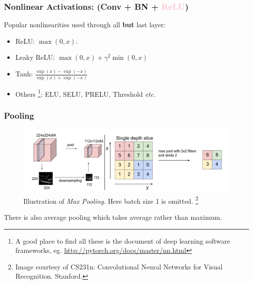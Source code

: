 \documentclass[10pt]{beamer}
\newcommand{\etc}{{\it etc.}}
\begin{document}
\begin{frame}
\frametitle{Nonlinear Activations: (Conv + BN + \textcolor{pink}{\textbf{ReLU}})}
Popular nonlinearities used through all \textbf{but} last layer:
\begin{itemize}
	\item ReLU: $\max (0, x)$.
	\item Leaky ReLU: $\max(0,x) + \gamma^2 \min(0,x)$
	\item Tanh: $\frac{\exp(x) -\exp(-x)}{\exp(x) + \exp(-x)}$
	\item Others \footnote{A good place to find all these is the document of deep learning software frameworks, eg. \url{http://pytorch.org/docs/master/nn.html}}: ELU, SELU, PRELU, Threshold \etc
\end{itemize}
	\begin{figure}
		\centering
	\end{figure}
\end{frame}

\begin{frame}
\frametitle{Pooling}
	\begin{figure}[H]
	\centerline{
		\includegraphics[width=1.0\textwidth]{pooling.png}
	}
	\caption{Illustration of \textit{Max Pooling}. Here batch size 1 is omitted. \footnote{Image courtesy of  CS231n: Convolutional Neural Networks for Visual Recognition.  Stanford.}}
	\end{figure}
	There is also average pooling which takes average rather than maximum.
\end{frame}
\end{document}
